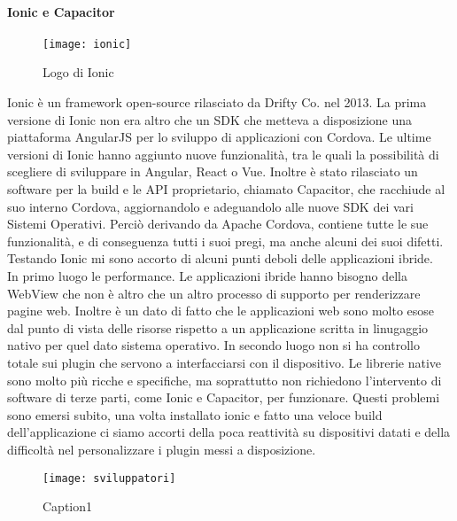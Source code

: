 \paragraph{Ionic e Capacitor}

\begin{figure}[h]
	\begin{center}
		\texttt{[image: ionic]}
		\caption{Logo di Ionic}
	\end{center}
\end{figure}

Ionic è un framework open-source rilasciato da Drifty Co. nel 2013. La prima versione di Ionic non era altro che un SDK che metteva a disposizione una
piattaforma AngularJS per lo sviluppo di applicazioni con Cordova. Le ultime versioni di Ionic hanno aggiunto nuove funzionalità, tra le
quali la possibilità di scegliere di sviluppare in Angular, React o Vue. Inoltre è stato rilasciato un software per la build e le API proprietario,
chiamato Capacitor, che racchiude al suo interno Cordova, aggiornandolo e adeguandolo alle nuove SDK dei vari Sistemi Operativi. Perciò derivando
da Apache Cordova, contiene tutte le sue funzionalità, e di conseguenza tutti i suoi pregi, ma anche alcuni dei suoi difetti. \\
Testando Ionic mi sono accorto di alcuni punti deboli delle applicazioni ibride. \\
In primo luogo le performance. Le applicazioni ibride hanno bisogno della WebView che non è altro che un altro processo di supporto per
renderizzare pagine web. Inoltre è un dato di fatto che le applicazioni web sono molto esose dal punto di vista delle risorse rispetto a un
applicazione scritta in linugaggio nativo per quel dato sistema operativo. In secondo luogo non si ha controllo totale sui plugin che
servono a interfacciarsi con il dispositivo. Le librerie native sono molto più ricche e specifiche, ma soprattutto non richiedono
l'intervento di software di terze parti, come Ionic e Capacitor, per funzionare. Questi problemi sono emersi subito, una volta installato
ionic e fatto una veloce build dell'applicazione ci siamo accorti della poca reattività su dispositivi datati e della difficoltà nel
personalizzare i plugin messi a disposizione. \\

\begin{wrapfigure}{l}{0.45\textwidth}
  \texttt{[image: sviluppatori]} 
  \caption{Caption1}
  \label{fig:sviluppatori}
\end{wrapfigure}

